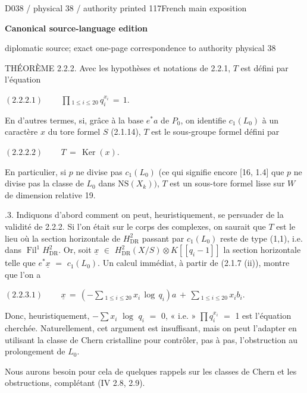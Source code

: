 \documentclass[9pt]{article}
\newcommand{\CanonText}[1]{\par{\fontsize{8.0}{9.35}\selectfont\RaggedRight #1\par}\vspace{2.2pt}}
\newcommand{\CanonDisplay}[1]{\par\vspace{1.2pt}\begin{center}{\fontsize{7.2}{8.4}\selectfont\(\displaystyle #1\)}\end{center}\vspace{1.2pt}}
\newcommand{\LayerTitle}{Canonical source-language edition}
\begin{document}
\noindent\begin{minipage}[t][\dimexpr\textheight-5pt\relax][t]{\textwidth}
{\sffamily\fontsize{7.3}{8.2}\selectfont\color{Quiet} D038 / physical 38 / authority printed 117\hfill French main exposition}
\par{}\vspace{4.5pt}
{\sffamily\fontsize{10.4}{11.6}\selectfont\bfseries\color{Accent} \LayerTitle}
\par{\sffamily\fontsize{6.7}{7.7}\selectfont\color{Quiet} diplomatic source; exact one-page correspondence to authority physical 38}
\vspace{5pt}
\CanonText{THÉORÈME 2.2.2. Avec les hypothèses et notations de 2.2.1, \(T\) est défini par l'équation}
\CanonDisplay{(2.2.2.1)\qquad\,\prod{}_{1\leq{}i\leq{}20}\,q_{i}^{x_{i}}\,=\,1.}
\CanonText{En d'autres termes, si, grâce à la base \(e^{*}a\) de \(P_{0}\), on identifie \(c_{1}(L_{0})\) à un caractère \(x\) du tore formel \(S\) (2.1.14), \(T\) est le sous-groupe formel défini par}
\CanonDisplay{(2.2.2.2)\qquad\,T\,=\,\operatorname{Ker}(x).}
\CanonText{En particulier, si \(p\) ne divise pas \(c_{1}(L_{0})\) (ce qui signifie encore [16, 1.4] que \(p\) ne divise pas la classe de \(L_{0}\) dans \(\mathrm{NS}(X_{k}))\), \(T\) est un sous-tore formel lisse sur \(W\) de dimension relative 19.}
\CanonText{2.2.3. Indiquons d'abord comment on peut, heuristiquement, se persuader de la validité de 2.2.2. Si l'on était sur le corps des complexes, on saurait que \(T\) est le lieu où la section horizontale de \(H^{2}_{\mathrm{DR}}\) passant par \(c_{1}(L_{0})\) reste de type (1,1), i.e. dans \(\operatorname{Fil}^{1}H^{2}_{\mathrm{DR}}\). Or, soit \(\underline{x}\) \(\in{}\) \(H^{2}_{\mathrm{DR}}(X/S)\otimes{}K[[q_{i}-1]]\) la section horizontale telle que \(e^{*}\underline{x}\) \(=\) \(c_{1}(L_{0})\). Un calcul immédiat, à partir de (2.1.7 (ii)), montre que l'on a}
\CanonDisplay{(2.2.3.1)\qquad\,\underline{x}\,=\,(-\sum{}_{1\leq{}i\leq{}20}\,x_{i}\,\operatorname{log}\,q_{i})a\,+\,\sum{}_{1\leq{}i\leq{}20}\,x_{i}b_{i}.}
\CanonText{Donc, heuristiquement, \(-\sum{}x_{i}\) \(\operatorname{log}\) \(q_{i}\) \(=\) 0, « i.e. » \(\prod{}q_{i}^{x_{i}}\) \(=\) 1 est l'équation cherchée. Naturellement, cet argument est insuffisant, mais on peut l'adapter en utilisant la classe de Chern cristalline pour contrôler, pas à pas, l'obstruction au prolongement de \(L_{0}\).}
\CanonText{Nous aurons besoin pour cela de quelques rappels sur les classes de Chern et les obstructions, complétant (IV 2.8, 2.9).}

\end{minipage}
\end{document}
